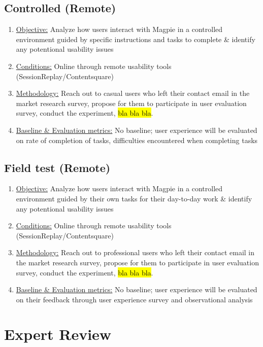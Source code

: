 \documentclass{report}
\begin{document}
\subsection{Controlled (Remote)}
\begin{enumerate}
    \item \underline{Objective:} Analyze how users interact with Magpie in a
          controlled environment guided by specific instructions and tasks to complete
          \& identify any potentional usability issues
    \item \underline{Conditions:} Online through remote usability tools
          (SessionReplay/Contentsquare)
    \item \underline{Methodology:} Reach out to casual users who left their contact
          email in the market research survey, propose for them to participate in user
          evaluation survey, conduct the experiment, \hl{bla bla bla}.
    \item \underline{Baseline \& Evaluation metrics:} No baseline; user
          experience will be evaluated on rate of completion of tasks, difficulties
          encountered when completing tasks
\end{enumerate}
\subsection{Field test (Remote)}
\begin{enumerate}
    \item \underline{Objective:} Analyze how users interact with Magpie in a
          controlled environment guided by their own tasks for their day-to-day work
          \& identify any potentional usability issues
    \item \underline{Conditions:} Online through remote usability tools
          (SessionReplay/Contentsquare)
    \item \underline{Methodology:} Reach out to professional users who left their contact
          email in the market research survey, propose for them to participate in user
          evaluation survey, conduct the experiment, \hl{bla bla bla}.
    \item \underline{Baseline \& Evaluation metrics:} No baseline; user
          experience will be evaluated on their feedback through user experience survey and observational analysis
\end{enumerate}
\section{Expert Review}
\end{document}
